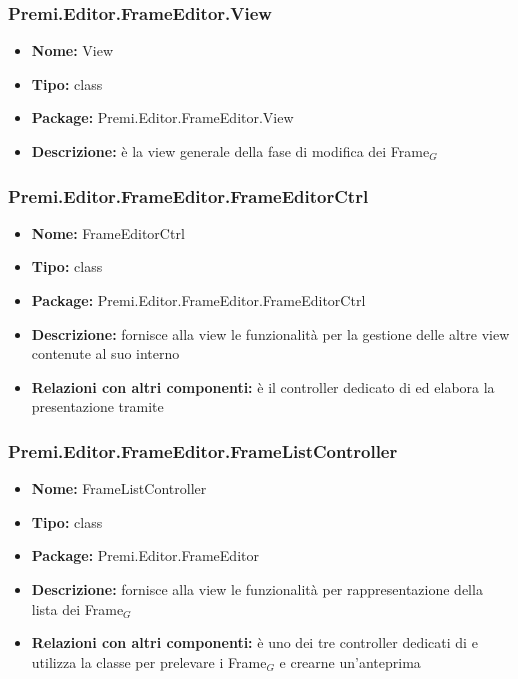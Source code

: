 \subsubsection{Premi.Editor.FrameEditor.View}
\begin{itemize}
  \item \textbf{Nome:} View
  \item \textbf{Tipo:} class
  \item \textbf{Package:} Premi.Editor.FrameEditor.View
  \item \textbf{Descrizione:} è la view generale della fase di modifica dei Frame$_G$
\end{itemize}
\subsubsection{Premi.Editor.FrameEditor.FrameEditorCtrl}
\begin{itemize}
  \item \textbf{Nome:} FrameEditorCtrl
  \item \textbf{Tipo:} class
  \item \textbf{Package:} Premi.Editor.FrameEditor.FrameEditorCtrl
  \item \textbf{Descrizione:} fornisce alla view le funzionalità per la gestione delle altre view contenute al suo interno
  \item \textbf{Relazioni con altri componenti:} è il controller dedicato di   ed elabora la presentazione tramite 
\end{itemize}
\subsubsection{Premi.Editor.FrameEditor.FrameListController}
\begin{itemize}
  \item \textbf{Nome:} FrameListController
  \item \textbf{Tipo:} class
  \item \textbf{Package:} Premi.Editor.FrameEditor
  \item \textbf{Descrizione:} fornisce alla view  le funzionalità per rappresentazione della lista dei Frame$_G$
  \item \textbf{Relazioni con altri componenti:} è uno dei tre controller dedicati di    e utilizza la classe  per prelevare i Frame$_G$ e crearne un'anteprima
\end{itemize}



